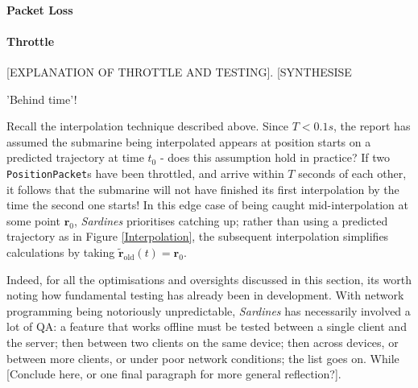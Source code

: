 \documentclass[a4paper, 9pt]{article}
\begin{document}
\begin{flushleft}
\paragraph{Packet Loss} 

\paragraph{Throttle} [EXPLANATION OF THROTTLE AND TESTING]. [SYNTHESISE

\vspace{5pt}\noindent
'Behind time'!

\vspace{5pt}\noindent
Recall the interpolation technique described above. Since $T < 0.1s$, the report has assumed the submarine being interpolated appears at position starts on a predicted trajectory at time $t_0$ - does this assumption hold in practice? If two \texttt{PositionPacket}s have been throttled, and arrive within $T$ seconds of each other, it follows that the submarine will not have finished its first interpolation by the time the second one starts! In this edge case of being caught mid-interpolation at some point $\mathbf{r}_0$, \textit{Sardines} prioritises catching up; rather than using a predicted trajectory as in Figure \ref{Interpolation}, the subsequent interpolation simplifies calculations by taking $\mathbf{\tilde{r}}_{\textrm{old}}(t) = \mathbf{r}_0$.

\vspace{5pt}\noindent
Indeed, for all the optimisations and oversights discussed in this section, its worth noting how fundamental testing has already been in development. With network programming being notoriously unpredictable, \textit{Sardines} has necessarily involved a lot of QA: a feature that works offline must be tested between a single client and the server; then between two clients on the same device; then across devices, or between more clients, or under poor network conditions; the list goes on. While [Conclude here, or one final paragraph for more general reflection?].



\end{flushleft}
\end{document}
